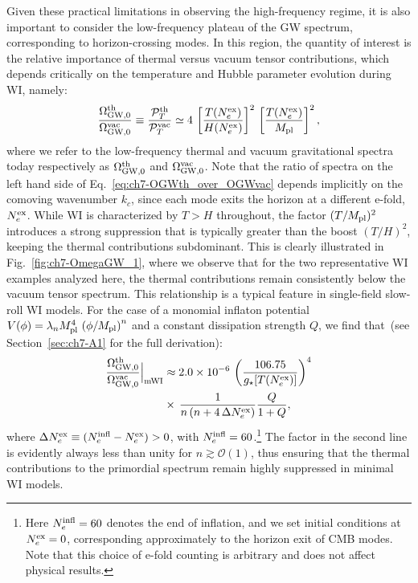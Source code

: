 Given these practical limitations in observing the high-frequency regime, it is also important to consider the low-frequency plateau of the GW spectrum, corresponding to horizon-crossing modes. In this region, the quantity of interest is the relative importance of thermal versus vacuum tensor contributions, which depends critically on the temperature and Hubble parameter evolution during WI, namely:
\begin{equation}
    \frac{\Omega_{\rm GW,0}^{\rm th}}{\Omega_{\rm GW,0}^{\rm vac}}\equiv \frac{\mathcal{P}^{\rm th}_T}{\mathcal{P}_T^{\rm vac}}\simeq 4\,\left[\frac{T(N_e^{\rm ex})}{H(N_e^{\rm ex})}\right]^2\,\left[\frac{T(N_e^{\rm ex})}{M_{\rm pl}}\right]^2, \label{eq:ch7-OGWth_over_OGWvac}
\end{equation}
where we refer to the low-frequency thermal and vacuum gravitational spectra today respectively as $\Omega_{\rm GW,0}^{\rm th}$ and $\Omega_{\rm GW,0}^{\rm vac}$. Note that the ratio of spectra on the left hand side of Eq.~\eqref{eq:ch7-OGWth_over_OGWvac} depends implicitly on the comoving wavenumber $k_c$, since each mode exits the horizon at a different e-fold, $N_e^{\rm ex}$. While WI is characterized by $T>H$ throughout, the factor $(T/M_{\rm pl})^2$ introduces a strong suppression that is  typically greater than the boost $(T/H)^2$, keeping the thermal contributions subdominant. This is clearly illustrated in Fig.~\ref{fig:ch7-OmegaGW_1}, where we observe that for the two representative WI examples analyzed here, the thermal contributions remain consistently below the vacuum tensor spectrum. This relationship is a typical feature in single-field slow-roll WI models. For the case of a monomial inflaton potential $V(\phi)=\lambda_n M_{\rm pl}^4\,\left(\phi/M_{\rm pl}\right)^n$ and a constant dissipation strength $Q$, we find that~(see Section~\ref{sec:ch7-A1} for the full derivation):
\begin{align}
    \frac{\Omega_{\rm GW,0}^{\rm th}}{\Omega_{\rm GW,0}^{\rm vac}}\Big|_{\rm mWI}&\approx 2.0\times 10^{-6}\, \left( \frac{106.75}{g_\star[T(N_e^{\rm ex})]}\right)^4 \nonumber \\
    &\times\,\frac{1}{n\left(n+4\,\Delta N_e^{\rm ex}\right)}\frac{Q}{1+Q},
\end{align}
where $\Delta N_e^{\rm ex}\equiv(N^{\rm infl}_e -N_e^{\rm ex})>0$, with $N_e^{\rm infl}=60$.\footnote{Here $N_e^{\rm infl}=60$ denotes the end of inflation, and we set initial conditions at $N_e^{\rm ex}=0$, corresponding approximately to the horizon exit of CMB modes. Note that this choice of e-fold counting is arbitrary and does not affect physical results.} The  factor in the second line is evidently always less than unity for
$n \gtrsim \mathcal{O}(1)$, thus ensuring that the thermal contributions to the primordial spectrum remain highly suppressed in minimal WI models.

